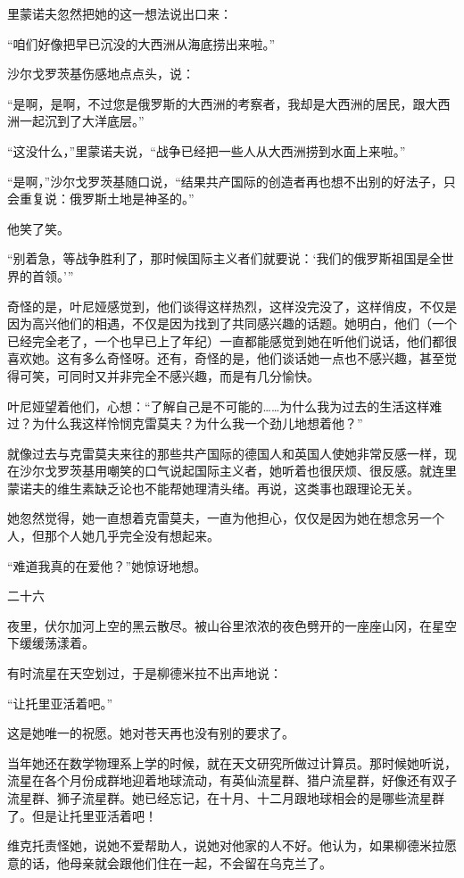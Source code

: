 里蒙诺夫忽然把她的这一想法说出口来：

“咱们好像把早已沉没的大西洲从海底捞出来啦。”

沙尔戈罗茨基伤感地点点头，说：

“是啊，是啊，不过您是俄罗斯的大西洲的考察者，我却是大西洲的居民，跟大西洲一起沉到了大洋底层。”

“这没什么，”里蒙诺夫说，“战争已经把一些人从大西洲捞到水面上来啦。”

“是啊，”沙尔戈罗茨基随口说，“结果共产国际的创造者再也想不出别的好法子，只会重复说：俄罗斯土地是神圣的。”

他笑了笑。

“别着急，等战争胜利了，那时候国际主义者们就要说：‘我们的俄罗斯祖国是全世界的首领。’”

奇怪的是，叶尼娅感觉到，他们谈得这样热烈，这样没完没了，这样俏皮，不仅是因为高兴他们的相遇，不仅是因为找到了共同感兴趣的话题。她明白，他们（一个已经完全老了，一个也早已上了年纪）一直都能感觉到她在听他们说话，他们都很喜欢她。这有多么奇怪呀。还有，奇怪的是，他们谈话她一点也不感兴趣，甚至觉得可笑，可同时又并非完全不感兴趣，而是有几分愉快。

叶尼娅望着他们，心想：“了解自己是不可能的……为什么我为过去的生活这样难过？为什么我这样怜悯克雷莫夫？为什么我一个劲儿地想着他？”

就像过去与克雷莫夫来往的那些共产国际的德国人和英国人使她非常反感一样，现在沙尔戈罗茨基用嘲笑的口气说起国际主义者，她听着也很厌烦、很反感。就连里蒙诺夫的维生素缺乏论也不能帮她理清头绪。再说，这类事也跟理论无关。

她忽然觉得，她一直想着克雷莫夫，一直为他担心，仅仅是因为她在想念另一个人，但那个人她几乎完全没有想起来。

“难道我真的在爱他？”她惊讶地想。

二十六

夜里，伏尔加河上空的黑云散尽。被山谷里浓浓的夜色劈开的一座座山冈，在星空下缓缓荡漾着。

有时流星在天空划过，于是柳德米拉不出声地说：

“让托里亚活着吧。”

这是她唯一的祝愿。她对苍天再也没有别的要求了。

当年她还在数学物理系上学的时候，就在天文研究所做过计算员。那时候她听说，流星在各个月份成群地迎着地球流动，有英仙流星群、猎户流星群，好像还有双子流星群、狮子流星群。她已经忘记，在十月、十二月跟地球相会的是哪些流星群了。但是让托里亚活着吧！

维克托责怪她，说她不爱帮助人，说她对他家的人不好。他认为，如果柳德米拉愿意的话，他母亲就会跟他们住在一起，不会留在乌克兰了。

